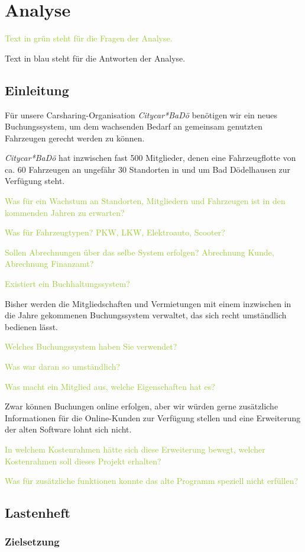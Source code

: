 
\chapter{Analyse}

\textcolor{YellowGreen}{Text in grün steht für die Fragen der Analyse.}

\textcolor{NavyBlue}{Text in blau steht für die Antworten der Analyse.}

\section{Einleitung}

Für unsere Carsharing-Organisation \emph{Citycar*BaDö} benötigen wir ein neues Buchungssystem, um dem wachsenden Bedarf an gemeinsam genutzten Fahrzeugen gerecht werden zu können. 

\emph{Citycar*BaDö} hat inzwischen fast 500 Mitglieder, denen eine Fahrzeugflotte von ca. 60 Fahrzeugen an ungefähr 30 Standorten in und um Bad Dödelhausen zur Verfügung steht. 

\textcolor{YellowGreen}{Was für ein Wachstum an Standorten, Mitgliedern und Fahrzeugen ist in den kommenden Jahren zu erwarten?}

\textcolor{YellowGreen}{Was für Fahrzeugtypen? PKW, LKW, Elektroauto, Scooter?}

\textcolor{YellowGreen}{Sollen Abrechnungen über das selbe System erfolgen? Abrechnung Kunde, Abrechnung Finanzamt?}

\textcolor{YellowGreen}{Existiert ein Buchhaltungssystem?}

Bisher werden die Mitgliedschaften und Vermietungen mit einem inzwischen in die Jahre gekommenen Buchungssystem verwaltet, das sich recht umständlich bedienen lässt. 

\textcolor{YellowGreen}{Welches Buchungssystem haben Sie verwendet?}

\textcolor{YellowGreen}{Was war daran so umständlich?}

\textcolor{YellowGreen}{Was macht ein Mitglied aus, welche Eigenschaften hat es?}

Zwar können Buchungen online erfolgen, aber wir würden gerne zusätzliche Informationen für die Online-Kunden zur Verfügung stellen und eine Erweiterung der alten Software lohnt sich nicht.

\textcolor{YellowGreen}{In welchem Kostenrahmen hätte sich diese Erweiterung bewegt, welcher Kostenrahmen soll dieses Projekt erhalten?}

\textcolor{YellowGreen}{Was für zusätzliche funktionen konnte das alte Programm speziell nicht erfüllen?}

\section{Lastenheft}

\subsection{Zielsetzung}